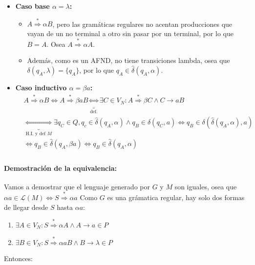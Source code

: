 \begin{itemize}
  \item \textbf{Caso base \(\alpha = \lambda\):}
        \begin{itemize}
          \item \(A\overset{*}{\Rightarrow} \alpha B\), pero las gramáticas regulares no acentan producciones que vayan de un no terminal a otro sin pasar por un terminal, por lo que \(B = A\). Osea \(A\overset{*}{\Rightarrow} \alpha A\).
          \item Además, como es un AFND, no tiene transiciones lambda, osea que \(\delta(q_A, \lambda) = \{q_A\}\), por lo que \(q_A\in\hat\delta(q_A, \alpha)\).
        \end{itemize}
  \item \textbf{Caso inductivo \(\alpha = \beta a\):}
        \begin{align*}
           & A\overset{*}{\Rightarrow} \alpha B  \iff A\overset{*}{\Rightarrow} \beta aB \underbrace{\iff}_{\text{def.}} \exists C\in V_N: A \overset{*}{\Rightarrow} \beta C \wedge C\rightarrow aB \\
           & \underbrace{\iff}_{\text{H.I. y def } M} \exists q_C\in Q, q_c\in\hat\delta(q_A,\alpha) \land q_B\in\delta(q_C,a) \iff q_B\in \delta(\hat\delta(q_A,\alpha),a)                          \\
           & \iff q_B\in\hat\delta(q_A, \beta a) \iff q_B\in\hat\delta(q_A, \alpha)                                                                                                                  \\
        \end{align*}
\end{itemize}

\paragraph{Demostración de la equivalencia:} Vamos a demostrar que el lenguaje generado por \(G\) y \(M\) son iguales, osea que \(\alpha a\in\mathcal{L}(M)\iff S\overset{*}{\Rightarrow} \alpha a\)
Como \(G\) es una grámatica regular, hay solo dos formas de llegar desde \(S\) hasta \(\alpha a\):
\begin{enumerate}
  \item \(\exists A\in V_N: S \overset{*}{\Rightarrow} \alpha A \wedge A \rightarrow a \in P\)
  \item \(\exists B\in V_N: S \overset{*}{\Rightarrow} \alpha aB \wedge B \rightarrow \lambda \in P\)
\end{enumerate}
Entonces:

